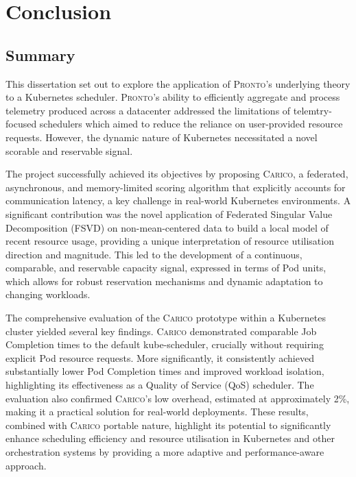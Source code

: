 \chapter{Conclusion}

%
%

\section{Summary}
This dissertation set out to explore the application of \textsc{Pronto}'s
underlying theory to a Kubernetes scheduler. \textsc{Pronto}'s ability to
efficiently aggregate and process telemetry produced across a datacenter
addressed the limitations of telemtry-focused schedulers which aimed to reduce
the reliance on user-provided resource requests. However, the dynamic nature of
Kubernetes necessitated a novel scorable and reservable signal.

The project successfully achieved its objectives by proposing \textsc{Carico}, a
federated, asynchronous, and memory-limited scoring algorithm that explicitly
accounts for communication latency, a key challenge in real-world Kubernetes
environments. A significant contribution was the novel application of Federated
Singular Value Decomposition (FSVD) on non-mean-centered data to build a local
model of recent resource usage, providing a unique interpretation of resource
utilisation direction and magnitude. This led to the development of a
continuous, comparable, and reservable capacity signal, expressed in terms of
Pod units, which allows for robust reservation mechanisms and dynamic adaptation
to changing workloads.

The comprehensive evaluation of the \textsc{Carico} prototype within a Kubernetes cluster
yielded several key findings. \textsc{Carico} demonstrated comparable Job
Completion times to the default kube-scheduler, crucially without requiring
explicit Pod resource requests. More significantly, it consistently achieved
substantially lower Pod Completion times and improved workload isolation,
highlighting its effectiveness as a Quality of Service (QoS) scheduler. The
evaluation also confirmed \textsc{Carico}'s low overhead, estimated at approximately 2\%,
making it a practical solution for real-world deployments. These results,
combined with \textsc{Carico} portable nature, highlight its potential to
significantly enhance scheduling efficiency and resource utilisation in
Kubernetes and other orchestration systems by providing a more adaptive and
performance-aware approach.

